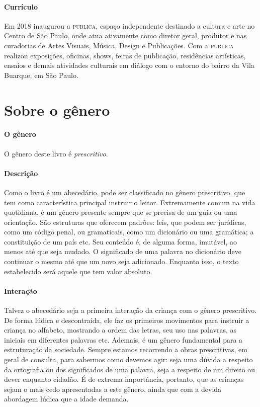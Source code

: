 \documentclass[11pt]{extarticle}
\begin{document}
\paragraph{Currículo} Em 2018 inaugurou a \textsc{publica}, espaço independente destinado a cultura e arte no Centro de São Paulo, onde atua ativamente como diretor geral, produtor e nas curadorias de Artes Visuais, Música, Design e Publicações. Com a \textsc{publica} realizou exposições, oficinas, shows, feiras de publicação, residências artísticas, ensaios e demais atividades culturais em diálogo com o entorno do bairro da Vila Buarque, em São Paulo.
 


\section{Sobre o gênero}

\paragraph{O gênero} O gênero deste livro é \textit{prescritivo}. 


\paragraph{Descrição} Como o livro é um abecedário, pode ser classificado no gênero prescritivo, que tem como característica principal instruir o leitor.
Extremamente comum na vida quotidiana, é um gênero presente
sempre que se precisa de um guia ou uma orientação. São estruturas 
que oferecem padrões: leis, que podem ser jurídicas, como um código
penal, ou gramaticais, como um dicionário ou uma gramática; a constituição
de um país etc. Seu conteúdo é, de alguma forma, imutável, ao menos até que seja
mudado. O significado de uma palavra no dicionário deve continuar o mesmo
até que um novo seja adicionado. Enquanto isso, o texto
estabelecido será aquele que tem valor absoluto.

\paragraph{Interação} Talvez o abecedário seja a primeira interação da criança com o gênero prescritivo. De forma lúdica e descontraída, ele faz os primeiros movimentos para instruir a criança no alfabeto, mostrando a ordem das letras, seu uso nas palavras, as iniciais em diferentes palavras etc. Ademais, é um gênero fundamental para a estruturação da sociedade.
Sempre estamos recorrendo a obras prescritivas, em geral de consulta, para
sabermos como devemos agir: seja uma dúvida a respeito da ortografia ou 
dos significados de uma palavra, seja a respeito de um direito ou dever
enquanto cidadão. É de extrema importância, portanto, que as crianças
sejam o mais cedo apresentadas a este gênero, ainda que com a 
devida abordagem lúdica que a idade demanda.
\end{document}
